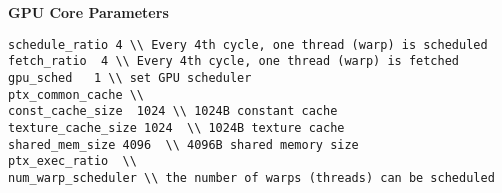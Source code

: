 \noindent  
{\bf GPU Core Parameters} 


\smallskip
\begin{lstlisting}
schedule_ratio 4 \\ Every 4th cycle, one thread (warp) is scheduled 
fetch_ratio  4 \\ Every 4th cycle, one thread (warp) is fetched 
gpu_sched   1 \\ set GPU scheduler 
ptx_common_cache \\ 
const_cache_size  1024 \\ 1024B constant cache  
texture_cache_size 1024  \\ 1024B texture cache
shared_mem_size 4096  \\ 4096B shared memory size 
ptx_exec_ratio  \\ 
num_warp_scheduler \\ the number of warps (threads) can be scheduled  
\end{lstlisting}
\smallskip











